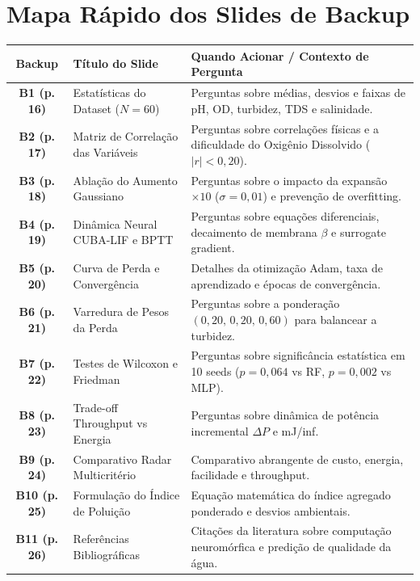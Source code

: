 \documentclass[11pt,a4paper]{article}
\begin{document}
\newpage
\section{Mapa Rápido dos Slides de Backup}

\begin{table}[h!]
\centering
\small
\renewcommand{\arraystretch}{1.3}
\begin{tabularx}{\textwidth}{c l X}
\toprule
\textbf{Backup} & \textbf{Título do Slide} & \textbf{Quando Acionar / Contexto de Pergunta} \\
\midrule
\textbf{B1 (p. 16)} & Estatísticas do Dataset ($N=60$) & Perguntas sobre médias, desvios e faixas de pH, OD, turbidez, TDS e salinidade. \\
\textbf{B2 (p. 17)} & Matriz de Correlação das Variáveis & Perguntas sobre correlações físicas e a dificuldade do Oxigênio Dissolvido ($|r| < 0{,}20$). \\
\textbf{B3 (p. 18)} & Ablação do Aumento Gaussiano & Perguntas sobre o impacto da expansão $\times 10$ ($\sigma=0{,}01$) e prevenção de overfitting. \\
\textbf{B4 (p. 19)} & Dinâmica Neural CUBA-LIF e BPTT & Perguntas sobre equações diferenciais, decaimento de membrana $\beta$ e surrogate gradient. \\
\textbf{B5 (p. 20)} & Curva de Perda e Convergência & Detalhes da otimização Adam, taxa de aprendizado e épocas de convergência. \\
\textbf{B6 (p. 21)} & Varredura de Pesos da Perda & Perguntas sobre a ponderação $(0{,}20,\,0{,}20,\,0{,}60)$ para balancear a turbidez. \\
\textbf{B7 (p. 22)} & Testes de Wilcoxon e Friedman & Perguntas sobre significância estatística em 10 seeds ($p=0{,}064$ vs RF, $p=0{,}002$ vs MLP). \\
\textbf{B8 (p. 23)} & Trade-off Throughput vs Energia & Perguntas sobre dinâmica de potência incremental $\Delta P$ e mJ/inf. \\
\textbf{B9 (p. 24)} & Comparativo Radar Multicritério & Comparativo abrangente de custo, energia, facilidade e throughput. \\
\textbf{B10 (p. 25)} & Formulação do Índice de Poluição & Equação matemática do índice agregado ponderado e desvios ambientais. \\
\textbf{B11 (p. 26)} & Referências Bibliográficas & Citações da literatura sobre computação neuromórfica e predição de qualidade da água. \\
\bottomrule
\end{tabularx}
\end{table}
\end{document}

